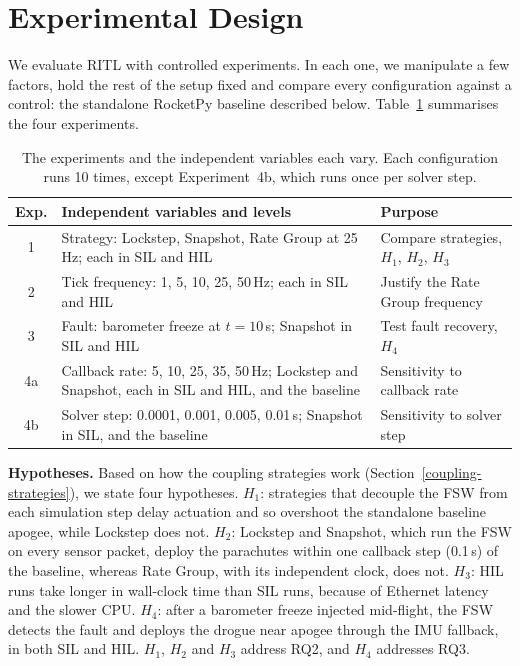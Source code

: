 \section{Experimental Design}\label{experiment-design}
We evaluate RITL with controlled experiments. In each one, we manipulate a few factors, hold the rest of the setup fixed and compare every configuration against a control: the standalone RocketPy baseline described below. Table~\ref{tab:experiments} summarises the four experiments.

\begin{table}[t]
\centering
\caption{The experiments and the independent variables each vary. Each configuration runs 10 times, except Experiment~4b, which runs once per solver step.}
\label{tab:experiments}
\small
\begin{tabular}{@{}cp{1.7in}p{0.95in}@{}}
\toprule
\textbf{Exp.} & \textbf{Independent variables and levels} & \textbf{Purpose} \\
\midrule
1 & Strategy: Lockstep, Snapshot, Rate Group at 25\,Hz; each in SIL and HIL & Compare strategies, $H_1$, $H_2$, $H_3$ \\
2 & Tick frequency: 1, 5, 10, 25, 50\,Hz; each in SIL and HIL & Justify the Rate Group frequency \\
3 & Fault: barometer freeze at $t{=}10$\,s; Snapshot in SIL and HIL & Test fault recovery, $H_4$ \\
4a & Callback rate: 5, 10, 25, 35, 50\,Hz; Lockstep and Snapshot, each in SIL and HIL, and the baseline & Sensitivity to callback rate \\
4b & Solver step: 0.0001, 0.001, 0.005, 0.01\,s; Snapshot in SIL, and the baseline & Sensitivity to solver step \\
\bottomrule
\end{tabular}
\end{table}
\textbf{Hypotheses.} Based on how the coupling strategies work (Section~\ref{coupling-strategies}), we state four hypotheses. $H_1$: strategies that decouple the FSW from each simulation step delay actuation and so overshoot the standalone baseline apogee, while Lockstep does not. $H_2$: Lockstep and Snapshot, which run the FSW on every sensor packet, deploy the parachutes within one callback step (0.1\,s) of the baseline, whereas Rate Group, with its independent clock, does not. $H_3$: HIL runs take longer in wall-clock time than SIL runs, because of Ethernet latency and the slower CPU. $H_4$: after a barometer freeze injected mid-flight, the FSW detects the fault and deploys the drogue near apogee through the IMU fallback, in both SIL and HIL. $H_1$, $H_2$ and $H_3$ address RQ2, and $H_4$ addresses RQ3.

